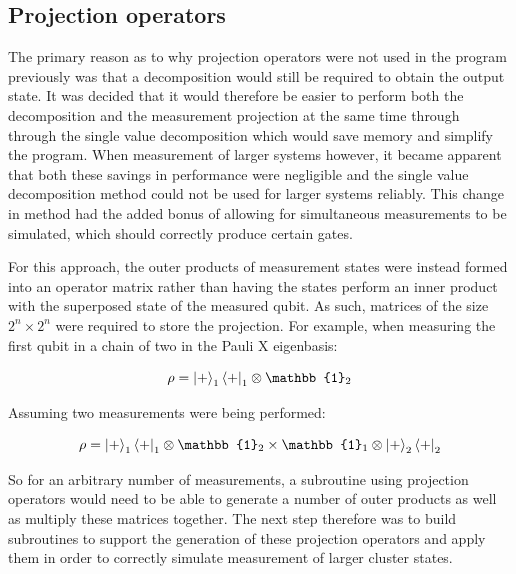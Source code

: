 
\subsection{Projection operators}

The primary reason as to why projection operators were not used in the program previously was that a decomposition would still be required to obtain the output state. It was decided that it would therefore be easier to perform both the decomposition and the measurement projection at the same time through through the single value decomposition which would save memory and simplify the program. When measurement of larger systems however, it became apparent that both these savings in performance were negligible and the single value decomposition method could not be used for larger systems reliably. This change in method had the added bonus of allowing for simultaneous measurements to be simulated, which should correctly produce certain gates.

For this approach, the outer products of measurement states were instead formed into an operator matrix rather than having the states perform an inner product with the superposed state of the measured qubit. As such, matrices of the size $2^{n} \times 2^{n}$ were required to store the projection. For example, when measuring the first qubit in a chain of two in the Pauli X eigenbasis:

\begin{equation}
\rho = \ket{+}_{1} \bra{+}_{1} \otimes \mathbb{1}_{2}
\end{equation} 

Assuming two measurements were being performed: 

\begin{equation}
\rho = \ket{+}_{1} \bra{+}_{1} \otimes \mathbb{1}_{2} \times \mathbb{1}_{1} \otimes \ket{+}_{2} \bra{+}_{2}
\end{equation} 

So for an arbitrary number of measurements, a subroutine using projection operators would need to be able to generate a number of outer products as well as multiply these matrices together. The next step therefore was to build subroutines to support the generation of these projection operators and apply them in order to correctly simulate measurement of larger cluster states.



